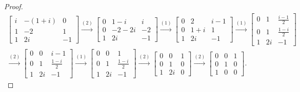 \begin{proof}
    \begingroup{}
    \allowdisplaybreaks{}
    \begin{align*}
        \begin{bmatrix}
            i & -(1 + i) & 0  \\
            1 & -2       & 1  \\
            1 & 2i       & -1
        \end{bmatrix}
        \stackrel{(2)}{\rightarrow}
        \begin{bmatrix}
            0 & 1 - i   & i  \\
            0 & -2 - 2i & -2 \\
            1 & 2i      & -1
        \end{bmatrix}
        \stackrel{(1)}{\rightarrow}
        \begin{bmatrix}
            0 & 2     & i - 1 \\
            0 & 1 + i & 1     \\
            1 & 2i    & -1
        \end{bmatrix}
        \stackrel{(1)}{\rightarrow}
        \begin{bmatrix}
            0 & 1  & \frac{i - 1}{2} \\
            0 & 1  & \frac{1 - i}{2} \\
            1 & 2i & -1
        \end{bmatrix} \\
        \stackrel{(2)}{\rightarrow}
        \begin{bmatrix}
            0 & 0  & i - 1           \\
            0 & 1  & \frac{1 - i}{2} \\
            1 & 2i & -1
        \end{bmatrix}
        \stackrel{(1)}{\rightarrow}
        \begin{bmatrix}
            0 & 0  & 1               \\
            0 & 1  & \frac{1 - i}{2} \\
            1 & 2i & -1
        \end{bmatrix}
        \stackrel{(2)}{\rightarrow}
        \begin{bmatrix}
            0 & 0  & 1 \\
            0 & 1  & 0 \\
            1 & 2i & 0
        \end{bmatrix}
        \stackrel{(2)}{\rightarrow}
        \begin{bmatrix}
            0 & 0 & 1 \\
            0 & 1 & 0 \\
            1 & 0 & 0
        \end{bmatrix}.
    \end{align*}
    \endgroup{}
\end{proof}

